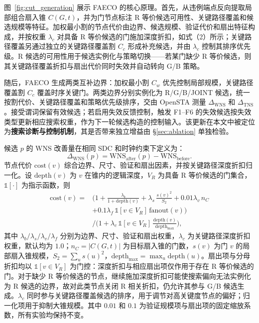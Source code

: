 \documentclass[twocolumn,10pt,fontset=windows]{ctexart}
\begin{document}
图~\ref{fig:cut_generation} 展示 FAECO 的核心原理。首先，从违例端点反向提取局部组合扇入锥 $C(G,t)$，并为门节点标注 R 等价候选可用性、关键路径覆盖和候选规模等特征。加权最小割的节点代价由边界、候选规模、验证代价和扇出特征构成，并按权重 $\lambda_c$ 对具备 R 等价候选的门施加深度折扣，如式（2）所示；关键路径覆盖另通过独立的关键路径覆盖割 $C_c$ 形成补充候选，并由 $\lambda_c$ 控制其排序优先级。R 候选的可用性用于候选实例化与策略切换——若某门缺少 R 等价候选，则其关键路径覆盖折扣与扇出代价同时失效并自动转向 G/B 策略。

随后，FAECO 生成两类互补边界：加权最小割 $C_w$ 优先控制局部规模，关键路径覆盖割 $C_c$ 覆盖时序关键门。两类边界分别实例化为 R/G/B/JOINT 候选，统一按割代价、关键路径覆盖和策略优先级排序，交由 OpenSTA 测量 $\Delta_{\mathrm{WNS}}$ 和 $\Delta_{\mathrm{TNS}}$。接受谓词保留有效候选；若启用失效反馈控制，触发 F1--F6 的失效候选按失效类型更新相应搜索权重，作为下一轮候选构造的控制输入。该更新在本文中被定位为\textbf{搜索诊断与控制机制}，其是否带来独立增益由 \S\ref{sec:ablation} 单独检验。

候选 $p$ 的 WNS 改善量在相同 SDC 和时钟约束下定义为：
\begin{equation}\label{eq:dtiming}
\Delta_{\mathrm{WNS}}(p) = \mathrm{WNS}_{\mathrm{after}}(p) - \mathrm{WNS}_{\mathrm{before}}.
\end{equation}
节点代价 $\mathrm{cost}(v)$ 综合边界、尺寸、验证和扇出因素，并按关键路径深度折扣归一化。设 $\mathrm{depth}(v)$ 为 $v$ 在锥内的逻辑深度，$V_R$ 为具备 R 等价候选的门集合，$\mathbb{1}[\cdot]$ 为指示函数，则
{\small
\begin{equation}
\label{eq:cost}
\begin{aligned}
\mathrm{cost}(v) ={}& \Big(1 + \frac{\lambda_b}{1+\mathrm{depth}(v)}
 + \lambda_s\,\frac{s(v)^2}{S_2}
 + 0.01\lambda_v\,n_C \\
 &+ 0.1\lambda_f\,\mathbb{1}[v{\in}V_R]\,\mathrm{fanout}(v)\Big) \\
 &\Big/\Big(1 + \lambda_c\,\mathbb{1}[v{\in}V_R]\,
 \frac{\mathrm{depth}(v)}{\mathrm{depth}_{\max}}\Big),
\end{aligned}
\end{equation}
}
其中 $\lambda_b/\lambda_s/\lambda_v/\lambda_f$ 分别为边界、尺寸、验证和扇出权重，$\lambda_c$ 为关键路径深度折扣权重，默认均为 $1.0$；$n_C=|C(G,t)|$ 为目标扇入锥的门数，$s(v)$ 为门 $v$ 的局部扇入锥规模，$S_2=\sum_u s(u)^2$，$\mathrm{depth}_{\max}=\max_u \mathrm{depth}(u)$。扇出项与分母折扣均以 $\mathbb{1}[v{\in}V_R]$ 为门控：深度折扣与相应扇出项仅作用于存在 R 等价候选的门。对于缺少 R 等价候选的节点，继续施加深度折扣可能使搜索偏向无法实例化为 R 候选的边界，故对此类节点关闭 R 相关折扣，仍允许其参与 G/B 候选生成。$\lambda_c$ 同时参与关键路径覆盖候选的排序，用于调节对高关键度节点的偏好；归一化项用于抑制大锥规模。其中 $0.01$ 和 $0.1$ 为验证规模项与扇出项的固定缩放系数，所有实验均保持不变。
\end{document}
